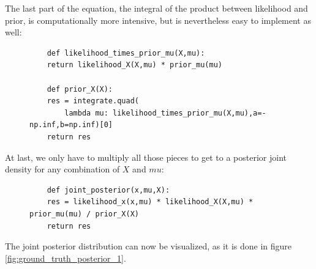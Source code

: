 \documentclass{article}
\begin{document}
The last part of the equation, the integral of the product between likelihood and prior, is computationally more intensive, but is nevertheless easy to implement as well:
\begin{figure}[H]
	\begin{lstlisting}
	def likelihood_times_prior_mu(X,mu):
	return likelihood_X(X,mu) * prior_mu(mu)
	
	def prior_X(X):
	res = integrate.quad(
		lambda mu: likelihood_times_prior_mu(X,mu),a=-np.inf,b=np.inf)[0]
	return res
	\end{lstlisting}
	\label{fig:prior_X}
\end{figure}
At last, we only have to multiply all those pieces to get to a posterior joint density for any combination of $X$ and $mu$:
\begin{figure}[H]
	\begin{lstlisting}
	def joint_posterior(x,mu,X):
	res = likelihood_x(x,mu) * likelihood_X(X,mu) * prior_mu(mu) / prior_X(X)
	return res
	\end{lstlisting}
	\label{fig:joint_posterior}
\end{figure}
The joint posterior distribution can now be visualized, as it is done in figure \ref{fig:ground_truth_posterior_1}.
\end{document}
